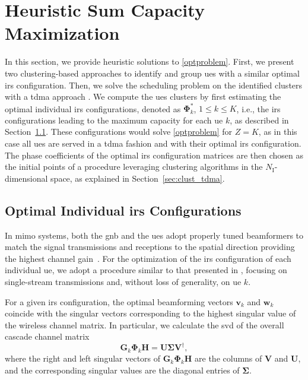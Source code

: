 \section{Heuristic Sum Capacity Maximization}
\label{sec:optimization}
In this section, we provide heuristic solutions to \eqref{optproblem}. First, we present two clustering-based approaches to identify and group \glspl{ue} with a similar optimal \gls{irs} configuration. Then, we solve the scheduling problem on the identified clusters with a \gls{tdma} approach \cite{anchora2012capacity}.
 We compute the \glspl{ue} clusters by first estimating the optimal {individual \gls{irs} configurations}, denoted as $\bm{\Phi}^*_k$, $1\leq k \leq K$, i.e., the \gls{irs} configurations leading to the maximum capacity for each \gls{ue} $k$, as described in Section~\ref{sec:ind_opt}.
 These configurations would solve \eqref{optproblem} for
$Z = K$, as in this case all \glspl{ue} are served in a \gls{tdma} fashion and with their optimal \gls{irs} configuration.
The phase coefficients of the optimal \gls{irs} configuration matrices are then chosen as the initial points of a procedure leveraging clustering algorithms in the $N_{\mathrm I}$-dimensional space, as explained in Section~\ref{sec:clust_tdma}.

\subsection{Optimal Individual \gls{irs} Configurations  }
\label{sec:ind_opt}
In \gls{mimo} systems, both the \gls{gnb} and the \glspl{ue} adopt properly tuned beamformers to match the signal transmissions and receptions to the spatial direction providing the highest channel gain~\cite{flamini2022towards}. For the optimization of the \gls{irs} configuration of each individual \gls{ue}, we adopt a procedure similar to that presented in \cite{Qian22joint}, focusing on single-stream transmissions and, without loss of generality, on \gls{ue} $k$.


For a given \gls{irs} configuration, the optimal beamforming vectors  $\bm{v}_k$ and $\bm{w}_k$ coincide with the singular vectors corresponding to the highest singular value of the wireless channel matrix. In particular, we calculate the \gls{svd} of the overall cascade channel matrix
\begin{equation}\label{eq:svd}
    \bm{G}_k \bm{\Phi}_k \bm{H} = \bm{U}\bm{\Sigma}\bm{V}^\dagger,
\end{equation}
where the right and left singular vectors of $\bm{G}_k \bm{\Phi}_k \bm{H}$ are the columns of $\bm{V}$ and $\bm{U}$, and the corresponding singular values are the diagonal entries of $\bm{\Sigma}$.

